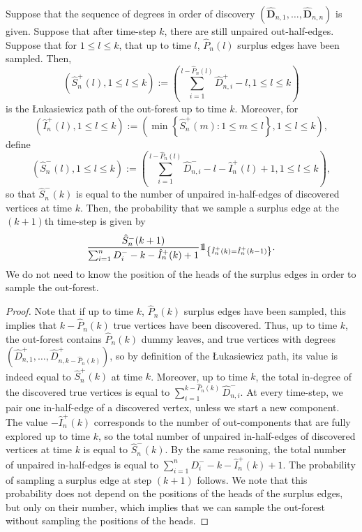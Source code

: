 \begin{proposition}\label{prop:sampleoutforest}
Suppose that the sequence of degrees in order of discovery $(\mathbf{\widehat{D}}_{n,1},\dots,\mathbf{\widehat{D}}_{n, n})$ is given. Suppose that after time-step $k$, there are still unpaired out-half-edges. Suppose that for $1\leq l\leq k$, that up to time $l$, $\hat{P}_n(l)$ surplus edges have been sampled. Then, $$\left(\hat{S}^+_n(l),1\leq l\leq k \right):=\left(\sum_{i=1}^{l-\hat{P}_n(l)}\widehat{D}^+_{n,i}-l,1\leq l\leq k\right)$$ is the \L ukasiewicz path of the out-forest up to time $k$. Moreover, for $$\left(\hat{I}^+_n(l),1\leq l\leq k\right):=\left(\min\left\{\hat{S}^+_n(m):1\leq m \leq l\right\},1\leq l \leq k \right),$$
define 
$$\left(\hat{S}^-_n(l),1\leq l \leq k\right):=\left(\sum_{i=1}^{l-\hat{P}_n(l)}\widehat{D}^-_{n,i}-l-\hat{I}^+_n(l)+1,1\leq l\leq k\right),$$
so that $\hat{S}^-_n(k)$ is equal to the number of unpaired in-half-edges of discovered vertices at time $k$. Then, the probability that we sample a surplus edge at the $(k+1)$th time-step is given by
$$\frac{\hat{S}^-_n(k+1)}{\sum_{i=1}^n D^-_i-k-\hat{I}^+_n(k)+1}\one_{\left\{\hat{I}^+_n(k)=\hat{I}^+_n(k-1)\right\}}.$$
We do not need to know the position of the heads of the surplus edges in order to sample the out-forest.
\end{proposition}
\begin{proof}
Note that if up to time $k$, $\hat{P}_n(k)$ surplus edges have been sampled, this implies that $k-\hat{P}_n(k)$ true vertices have been discovered. Thus, up to time $k$, the out-forest contains $\hat{P}_n(k)$ dummy leaves, and true vertices with degrees $(\widehat{D}^+_{n,1},\dots,\widehat{D}^+_{n,k-\hat{P}_n(k)})$, so by definition of the \L ukasiewicz path, its value is indeed equal to $\hat{S}^+_n(k)$ at time $k$. Moreover, up to time $k$, the total in-degree of the discovered true vertices is equal to $\sum_{i=1}^{k-\hat{P}_n(k)}\widehat{D}^-_{n,i}$. At every time-step, we pair one in-half-edge of a discovered vertex, unless we start a new component. The value $-\hat{I}^+_n(k)$ corresponds to the number of out-components that are fully explored up to time $k$, so the total number of unpaired in-half-edges of discovered vertices at time $k$ is equal to $\hat{S}^-_n(k)$. By the same reasoning, the total number of unpaired in-half-edges is equal to $\sum_{i=1}^n D^-_i-k-\hat{I}^+_n(k)+1$. The probability of sampling a surplus edge at step $(k+1)$ follows. We note that this probability does not depend on the positions of the heads of the surplus edges, but only on their number, which implies that we can sample the out-forest without sampling the positions of the heads.
\end{proof}
